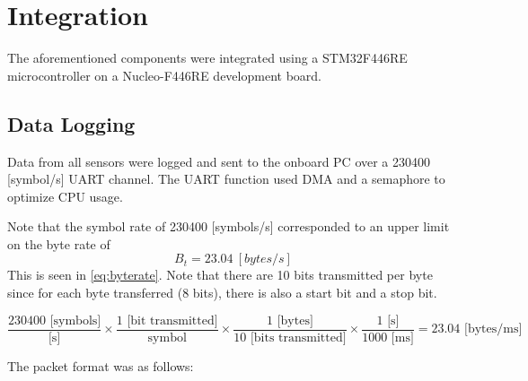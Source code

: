 \documentclass{article}
\begin{document}
%
%
%
%

\section{Integration} \label{integration}
The aforementioned components were integrated using a STM32F446RE microcontroller on a Nucleo-F446RE development board.

\subsection{Data Logging}
Data from all sensors were logged and sent to the onboard PC over a 230400 [symbol/s] UART channel. The UART function used DMA and a semaphore to optimize CPU usage.


Note that the symbol rate of 230400 [symbols/s] corresponded to an upper limit on the byte rate of 
$$B_t = 23.04 \ [bytes/s]$$
This is seen in \ref{eq:byterate}. Note that there are 10 bits transmitted per byte since for each byte transferred (8 bits), there is also a start bit and a stop bit.

\begin{equation}\label{eq:byterate}
\frac{230400 \text{ [symbols]}}{\text{[s]}}
\times 
\frac{1 \text{ [bit \ transmitted]}}{\text{symbol}}
\times
\frac{1 \text{ [bytes]}}{10 \text{ [bits transmitted]}}
\times
\frac{1 \text{ [s]}}{1000 \text{ [ms]}}
=
23.04 \text{ [bytes/ms]}
\end{equation}


The packet format was as follows:
\end{document}
